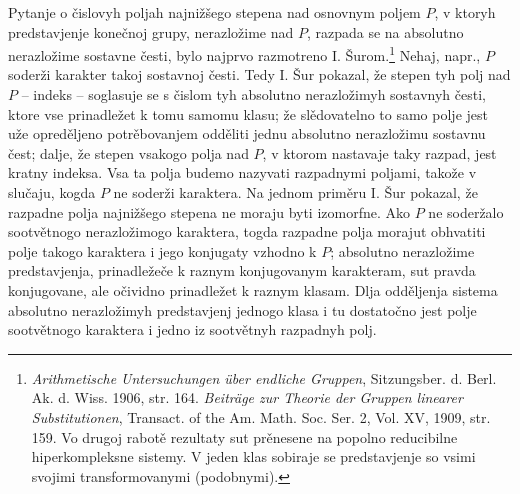 \documentclass[11pt]{article}
\begin{document}
\setcounter{footnote}{0}

\noindent Pytanje o čislovyh poljah najnižšego stepena nad osnovnym poljem $P$, v ktoryh predstavjenje konečnoj grupy, nerazložime nad $P$, razpada se na absolutno nerazložime sostavne česti, bylo najprvo razmotreno I. Šurom.\footnote{\emph{Arithmetische Untersuchungen über endliche Gruppen}, Sitzungsber. d. Berl. Ak. d. Wiss. 1906, str. 164. \emph{Beiträge zur Theorie der Gruppen linearer Substitutionen}, Transact. of the Am. Math. Soc. Ser. 2, Vol. XV, 1909, str. 159. Vo drugoj rabotě rezultaty sut prěnesene na popolno reducibilne hiperkompleksne sistemy. V jeden klas sobiraje se predstavjenje so vsimi svojimi transformovanymi (podobnymi).} Nehaj, napr., $P$ soderži karakter takoj sostavnoj česti. Tedy I. Šur pokazal, že stepen tyh polj nad $P$ -- indeks -- soglasuje se s čislom tyh absolutno nerazložimyh sostavnyh česti, ktore vse prinadležet k tomu samomu klasu; že slědovatelno to samo polje jest uže opreděljeno potrěbovanjem odděliti jednu absolutno nerazložimu sostavnu čest; dalje, že stepen vsakogo polja nad $P$, v ktorom nastavaje taky razpad, jest kratny indeksa. Vsa ta polja budemo nazyvati razpadnymi poljami, takože v slučaju, kogda $P$ ne soderži karaktera. Na jednom priměru I. Šur pokazal, že razpadne polja najnižšego stepena ne moraju byti izomorfne. Ako $P$ ne soderžalo sootvětnogo nerazložimogo karaktera, togda razpadne polja morajut obhvatiti polje takogo karaktera i jego konjugaty vzhodno k $P$; absolutno nerazložime predstavjenja, prinadležeče k raznym konjugovanym karakteram, sut pravda konjugovane, ale očividno prinadležet k raznym klasam. Dlja odděljenja sistema absolutno nerazložimyh predstavjenj jednogo klasa i tu dostatočno jest polje sootvětnogo karaktera i jedno iz sootvětnyh razpadnyh polj.
\end{document}
